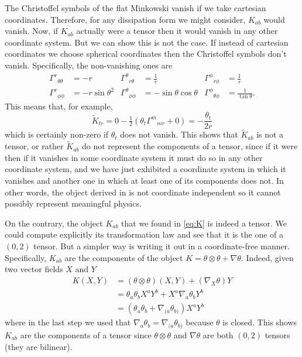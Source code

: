 \documentclass[../main.tex]{subfiles}
\begin{document}
The Christoffel symbols of the flat Minkowski vanish if we take cartesian coordinates.
Therefore, for any dissipation form we might consider, \( K_{ab} \) would vanish. Now, if
\( K_{ab} \) actually were a tensor then it would vanish in any other coordinate system.
But we can show this is not the case. If instead of cartesian coordinates we choose
spherical coordinates then the Christoffel symbols don't vanish. Specifically, the
non-vanishing ones are
\begin{align*}
	{\Gamma^r}_{\theta\theta} & = -r & {\Gamma^\theta}_{r\theta} & = \frac{1}{r} &
	{\Gamma^\phi}_{r\phi} & = \frac{1}{r} \\
	{\Gamma^r}_{\phi\phi} & = -r \sin{\theta}^2 & {\Gamma^\theta}_{\phi\phi} & =
	-\sin{\theta}\cos{\theta} & {\Gamma^\phi}_{\theta\phi} & = \frac{1}{\tan{\theta}}. 
\end{align*}
This means that, for example,
\begin{equation*}
	\tilde{K}_{tr} = 0 - \tfrac{1}{2}(\theta_t {\Gamma^m}_{mr} + 0) =
	-\frac{\theta_t}{2r}
\end{equation*}
which is certainly non-zero if \( \theta_t \) does not vanish. This shows that \(
\tilde{K}_{ab} \) is not a tensor, or rather \( \tilde{K}_{ab} \) do not represent the
components of a tensor, since if it were then if it vanishes in some coordinate system it
must do so in any other coordinate system, and we have just exhibited a coordinate system
in which it vanishes and another one in which at least one of its components does not. In
other words, the object derived in \cite{Lazo2017} is not coordinate independent so it
cannot possibly represent meaningful physics. 

On the contrary, the object \( K_{ab} \) that we found in \cref{eq:K} is indeed a tensor.
We could compute explicitly its transformation law and see that it is the one of a \(
(0,2) \) tensor. But a simpler way is writing it out in a coordinate-free manner.
Specifically, \( K_{ab} \) are the components of the object \( K = \theta \otimes \theta +
\nabla \theta \). Indeed, given two vector fields \( X \) and \( Y \)
\begin{align*} 
	K(X,Y) & = (\theta \otimes \theta)(X,Y) + (\nabla_X \theta)Y \\
				 & = \theta_a \theta_b X^a Y^b + X^a \nabla_a \theta_b Y^b \\
				 & = (\theta_a \theta_b + \nabla_{(a}\theta_{b)})X^a Y^b
\end{align*}
where in the last step we used that \( \nabla_{a}\theta_b = \nabla_{(a}\theta_{b)} \)
because \( \theta \) is closed. This shows \( K_{ab} \) are the components of a tensor
since \( \theta \otimes \theta \) and \( \nabla \theta \) are both \( (0,2) \) tensors
(they are bilinear). 
\end{document}
